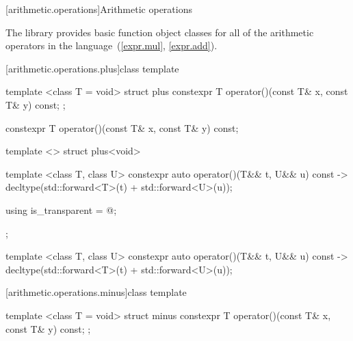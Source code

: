 \begin{itemdescr}
\pnum\returns {}
\end{itemdescr}

[arithmetic.operations]{Arithmetic operations}

\pnum
The library provides basic function object classes for all of the arithmetic
operators in the language~(\ref{expr.mul}, \ref{expr.add}).

[arithmetic.operations.plus]{class template }

%
\begin{itemdecl}
template <class T = void> struct plus {
  constexpr T operator()(const T& x, const T& y) const;
};
\end{itemdecl}

%
\begin{itemdecl}
constexpr T operator()(const T& x, const T& y) const;
\end{itemdecl}

\begin{itemdescr}
\pnum\returns {}
\end{itemdescr}

%
\begin{itemdecl}
template <> struct plus<void> {
  template <class T, class U> constexpr auto operator()(T&& t, U&& u) const
    -> decltype(std::forward<T>(t) + std::forward<U>(u));

  using is_transparent = @\unspec@;
};
\end{itemdecl}

%
\begin{itemdecl}
template <class T, class U> constexpr auto operator()(T&& t, U&& u) const
    -> decltype(std::forward<T>(t) + std::forward<U>(u));
\end{itemdecl}

\begin{itemdescr}
\pnum\returns {}
\end{itemdescr}

[arithmetic.operations.minus]{class template }

%
\begin{itemdecl}
template <class T = void> struct minus {
  constexpr T operator()(const T& x, const T& y) const;
};
\end{itemdecl}

